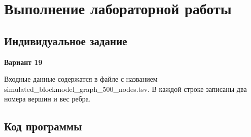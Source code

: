 \chapter{Выполнение лабораторной работы}

\section{Индивидуальное задание}

\textbf{Вариант 19}

Входные данные содержатся в файле с названием
simulated\_blockmodel\newline\_graph\_500\_nodes.tsv. В каждой строке записаны два
номера вершин и вес ребра.




\section{Код программы}

